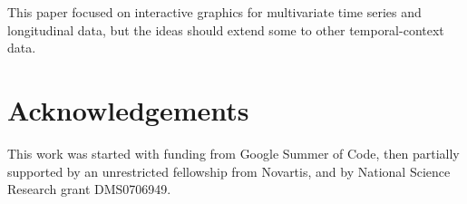 \documentclass[12pt]{article}
\begin{document}
This paper focused on interactive graphics for multivariate time series and longitudinal data, but the ideas should extend some to other temporal-context data.



\section*{Acknowledgements}
This work was started with funding from Google Summer of Code,
then partially supported by an unrestricted fellowship from
Novartis, and by National Science Research grant DMS0706949.



\end{document}
